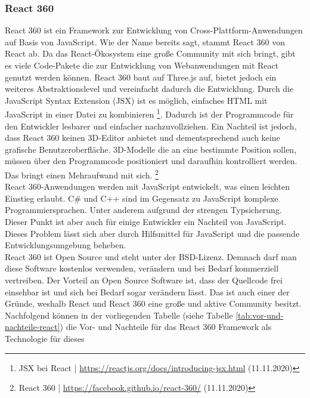 \documentclass[a4paper,12pt,oneside]{article}
\begin{document}
      \subsubsection{React 360}
        React 360 ist ein Framework zur Entwicklung von Cross-Plattform-Anwendungen auf
        Basis von JavaScript. Wie der Name bereits sagt, stammt React 360 von React ab.
        Da das React-Ökosystem eine große Community mit sich bringt, gibt es viele
        Code-Pakete die zur Entwicklung von Webanwendungen mit React genutzt werden können.
        React 360 baut auf Three.js auf, bietet jedoch ein weiteres Abstraktionslevel und
        vereinfacht dadurch die Entwicklung. Durch die JavaScript Syntax Extension (JSX)
        ist es möglich, einfaches HTML mit JavaScript in einer Datei zu kombinieren 
        \footnote{JSX bei React | \url{https://reactjs.org/docs/introducing-jsx.html} (11.11.2020)}.
        Dadurch ist der Programmcode für den Entwickler lesbarer und einfacher nachzuvollziehen.
        Ein Nachteil ist jedoch, dass React 360 keinen 3D-Editor anbietet und dementsprechend
        auch keine grafische Benutzeroberfläche. 3D-Modelle die
        an eine bestimmte Position sollen, müssen über den Programmcode positioniert und
        daraufhin kontrolliert werden. Das bringt einen Mehraufwand mit sich.
        \footnote{React 360 | \url{https://facebook.github.io/react-360/} (11.11.2020)} \\
        React 360-Anwendungen werden mit JavaScript entwickelt, was einen leichten Einstieg
        erlaubt. C\# und C++ sind im Gegensatz zu JavaScript komplexe
        Programmiersprachen. Unter anderem aufgrund der strengen Typsicherung. Dieser
        Punkt ist aber auch für einige Entwickler ein Nachteil von JavaScript. Dieses
        Problem lässt sich aber durch Hilfsmittel für JavaScript und die passende 
        Entwicklungsumgebung beheben. \\
        React 360 ist Open Source und steht unter der BSD-Lizenz. Demnach darf man diese
        Software kostenlos verwenden, verändern und bei Bedarf kommerziell vertreiben. Der
        Vorteil an Open Source Software ist, dass der Quellcode frei einsehbar ist und 
        sich bei Bedarf sogar verändern lässt. Das ist auch einer der Gründe, weshalb
        React und React 360 eine große und aktive Community besitzt. \\
        Nachfolgend können in der vorliegenden Tabelle (siehe Tabelle \ref{tab:vor-und-nachteile-react}) 
        die Vor- und Nachteile für das React 360 Framework als Technologie für dieses 
\end{document}
